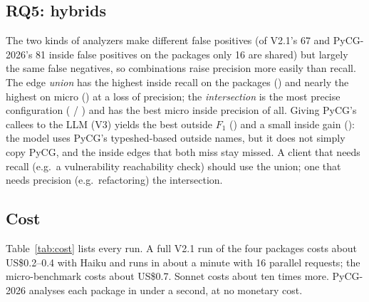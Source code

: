 \begin{table}[t]
  \caption{Three runs of V2.1 (Haiku) on the four packages.}
  \label{tab:repeats}
  \small
  
\end{table}


\subsection{RQ5: hybrids}
\label{sec:rq5}

The two kinds of analyzers make different false positives (of V2.1's 67 and
PyCG-2026's 81 inside false positives on the packages only 16 are shared) but
largely the same false negatives, so combinations raise precision more easily
than recall. The edge \emph{union} has the highest inside recall on the packages
() and nearly the highest on micro
() at a loss of precision; the \emph{intersection} is the most precise configuration
( / )
and has the best micro inside precision of all. Giving PyCG's callees to the LLM
(V3) yields the best outside $F_1$ () and a
small inside gain (): the model uses PyCG's
typeshed-based outside names, but it does not simply copy PyCG, and the inside
edges that both miss stay missed. A client that needs recall (e.g.\ a
vulnerability reachability check) should use the union; one that needs
precision (e.g.\ refactoring) the intersection.


\subsection{Cost}

Table~\ref{tab:cost} lists every run. A full V2.1 run of the four packages costs
about US\$0.2--0.4 with Haiku and runs in about a minute with 16 parallel
requests; the micro-benchmark costs about US\$0.7. Sonnet costs about ten times
more. PyCG-2026 analyses each package in under a second, at no monetary cost.

\begin{table}[t]
  \caption{LLM usage per run (new requests only; answers replayed from the cache are free).}
  \label{tab:cost}
  \small
  \setlength{\tabcolsep}{3pt}
  
\end{table}
